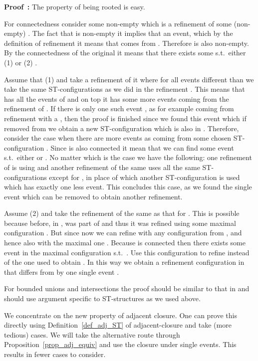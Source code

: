 \documentclass[submission,copyright,creativecommons]{eptcs}
\newenvironment{proof}[1][\!\!\,]{\vspace{1ex}\noindent\textbf{Proof #1: }}{\hfill\vspace{2ex}}
\newcounter{case}
\begin{document}
\begin{proof}
The property of being rooted is easy. 

For connectedness consider some non-empty  which is a refinement of some (non-empty) . The fact that is non-empty it implies that  an event, which by the definition of refinement it means that  comes from . Therefore  is also non-empty. By the connectedness of the original  it means that there exists some  s.t.\ either (1)  or (2) .

Assume that (1)  and take a refinement of it where for all events different than  we take the same ST-configurations  as we did in the refinement . This means that  has all the events of  and on top it has some more events coming from the refinement of . If there is only one such event , as for example coming from refinement with a , then the proof is finished since we found this event which if removed from  we obtain a new ST-configuration which is also in . Therefore, consider the case when there are more events  as coming from some chosen ST-configuration . Since  is also connected it mean that we can find some event  s.t.\ either  or . No matter which is the case we have the following: one refinement of  is  using  and another refinement of the same  uses all the same ST-configurations except for , in place of which another ST-configuration is used which has exactly one less event. This concludes this case, as we found the single event  which can be removed to obtain another refinement.

Assume (2)  and take the refinement of  the same as that for . This is possible because before, in ,  was part of  and thus it was refined using some maximal configuration . But since now  we can refine with any configuration from , and hence also with the maximal one . Because  is connected then there exists some event  in the maximal configuration  s.t.\ . Use this configuration to refine  instead of the one  used to obtain . In this way we obtain a refinement configuration in  that differs from  by one single event .

For bounded unions and intersections the proof should be similar to that in \cite[Prop.5.6]{GlabbeekG01refinement} and should use argument specific to ST-structures as we used above.

We concentrate on the new property of adjacent closure. 
One can prove this directly using Definition~\ref{def_adj_ST} of adjacent-closure and take (more tedious) cases.
We will take the alternative route through Proposition~\ref{prop_adj_equiv} and use the closure under single events. This results in fewer cases to consider.


\end{proof}
\end{document}
